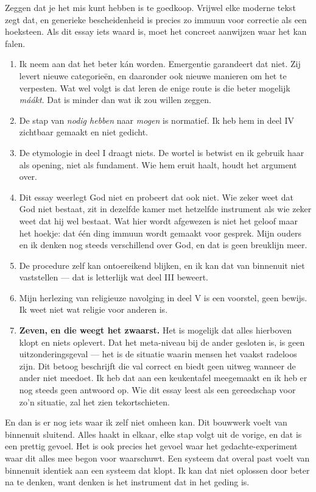 \documentclass[11pt,a4paper]{article}
\begin{document}
Zeggen dat je het mis kunt hebben is te goedkoop. Vrijwel elke moderne tekst zegt dat, en generieke bescheidenheid is precies zo immuun voor correctie als een hoeksteen. Als dit essay iets waard is, moet het concreet aanwijzen waar het kan falen.

\begin{enumerate}[label=\textbf{\arabic*}.]
    \item Ik neem aan dat het beter kán worden. Emergentie garandeert dat niet. Zij levert nieuwe categorieën, en daaronder ook nieuwe manieren om het te verpesten. Wat wel volgt is dat leren de enige route is die beter mogelijk \textit{máákt}. Dat is minder dan wat ik zou willen zeggen.
    \item De stap van \textit{nodig hebben} naar \textit{mogen} is normatief. Ik heb hem in deel IV zichtbaar gemaakt en niet gedicht.
    \item De etymologie in deel I draagt niets. De wortel is betwist en ik gebruik haar als opening, niet als fundament. Wie hem eruit haalt, houdt het argument over.
    \item Dit essay weerlegt God niet en probeert dat ook niet. Wie zeker weet dat God niet bestaat, zit in dezelfde kamer met hetzelfde instrument als wie zeker weet dat hij wel bestaat. Wat hier wordt afgewezen is niet het geloof maar het hoekje: dat één ding immuun wordt gemaakt voor gesprek. Mijn ouders en ik denken nog steeds verschillend over God, en dat is geen breuklijn meer.
    \item De procedure zelf kan ontoereikend blijken, en ik kan dat van binnenuit niet vaststellen --- dat is letterlijk wat deel III beweert.
    \item Mijn herlezing van religieuze navolging in deel V is een voorstel, geen bewijs. Ik weet niet wat religie voor anderen is.
    \item \textbf{Zeven, en die weegt het zwaarst.} Het is mogelijk dat alles hierboven klopt en niets oplevert. Dat het meta-niveau bij de ander gesloten is, is geen uitzonderingsgeval --- het is de situatie waarin mensen het vaakst radeloos zijn. Dit betoog beschrijft die val correct en biedt geen uitweg wanneer de ander niet meedoet. Ik heb dat aan een keukentafel meegemaakt en ik heb er nog steeds geen antwoord op. Wie dit essay leest als een gereedschap voor zo'n situatie, zal het zien tekortschieten.
\end{enumerate}

En dan is er nog iets waar ik zelf niet omheen kan. Dit bouwwerk voelt van binnenuit sluitend. Alles haakt in elkaar, elke stap volgt uit de vorige, en dat is een prettig gevoel. Het is ook precies het gevoel waar het gedachte-experiment waar dit alles mee begon voor waarschuwt. Een systeem dat overal past voelt van binnenuit identiek aan een systeem dat klopt. Ik kan dat niet oplossen door beter na te denken, want denken is het instrument dat in het geding is.
\end{document}
